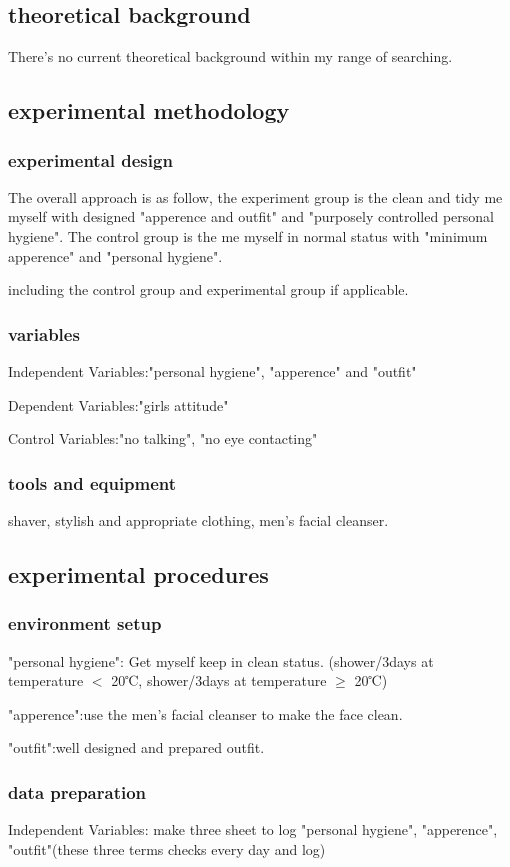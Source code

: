 \documentclass{article}
\begin{document}
\subsection{theoretical background}
There's no current theoretical background
within my range of searching.

\subsection{experimental methodology}
\subsubsection{experimental design}
The overall approach is as follow, the experiment
group is the clean and tidy me myself with
designed "apperence and outfit" and
"purposely controlled personal hygiene".
The control group is the me myself in normal
status with "minimum apperence" and
"personal hygiene".

including the control group and experimental
group if applicable.
\subsubsection{variables}
Independent Variables:"personal hygiene",
"apperence" and "outfit"

Dependent Variables:"girls attitude"

Control Variables:"no talking", "no eye contacting"
\subsubsection{tools and equipment}
shaver, stylish and appropriate clothing,
men's facial cleanser.

\subsection{experimental procedures}
\subsubsection{environment setup}
"personal hygiene":
Get myself keep in clean status.
(shower/3days at temperature $<$ 20℃,
shower/3days at temperature $\geq$ 20℃)

"apperence":use the men's facial cleanser
to make the face clean.

"outfit":well designed and prepared outfit.
\subsubsection{data preparation}
Independent Variables: make three sheet to log
"personal hygiene",
"apperence",
"outfit"(these three terms checks
every day and log)
\end{document}
